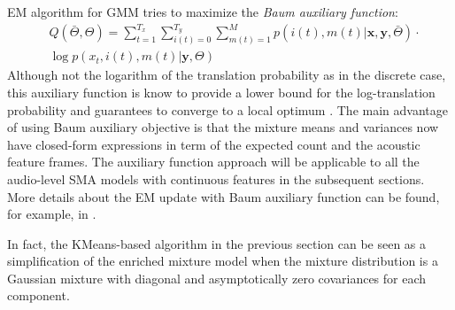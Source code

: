 \documentclass[journal]{IEEEtran}
\begin{document}
EM algorithm for GMM tries to maximize the \textit{Baum auxiliary function}:
\begin{align}\label{eq:multimodal_gmm_objective}
&Q(\bar{\Theta}, \Theta) = \sum_{t=1}^{T_x}\sum_{i(t)=0}^{T_y}\sum_{m(t)=1}^M p(i(t), m(t)|\mathbf x, \mathbf y, \bar {\Theta}) \cdot \nonumber\\
&\log p(x_t, i(t), m(t)| \mathbf y, \Theta)
\end{align}
Although not the logarithm of the translation probability as in the discrete case, this auxiliary function is know to provide a lower bound for the log-translation probability and guarantees to converge to a local optimum \cite{Bilmes1998}. The main advantage of using Baum auxiliary objective is that the mixture means and variances now have closed-form expressions in term of the expected count and the acoustic feature frames. The auxiliary function approach will be applicable to all the audio-level SMA models with continuous features in the subsequent sections. More details about the EM update with Baum auxiliary function can be found, for example, in \cite{Bilmes1998}. 

In fact, the KMeans-based algorithm in the previous section can be seen as a simplification of the enriched mixture model when the mixture distribution is a Gaussian mixture with diagonal and asymptotically zero covariances for each component. 


\end{document}
